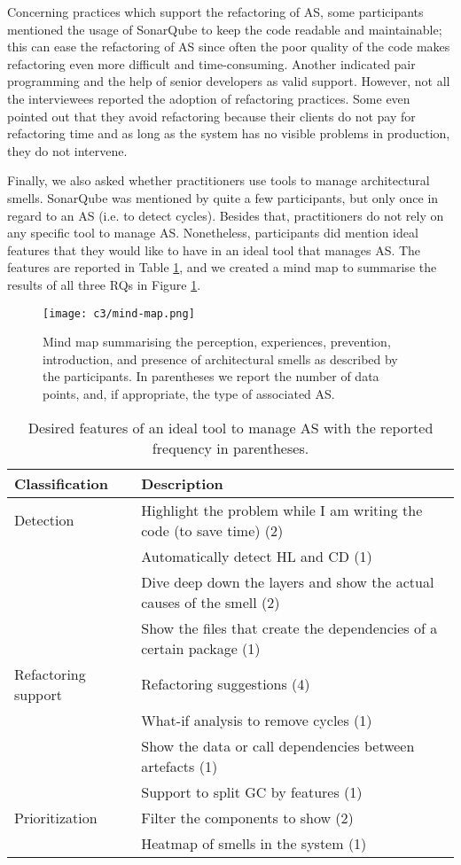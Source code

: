 Concerning practices which support the refactoring of AS, some participants mentioned the usage of SonarQube to keep the code readable and maintainable; this can ease the refactoring of AS since often the poor quality of the code makes refactoring even more difficult and time-consuming. Another indicated pair programming and the help of senior developers as valid support. However, not all the interviewees reported the adoption of refactoring practices. Some even pointed out that they avoid refactoring because their clients do not pay for refactoring time and as long as the system has no visible problems in production, they do not intervene.

Finally, we also asked whether practitioners use tools to manage architectural smells. SonarQube was mentioned by quite a few participants, but only once in regard to an AS (i.e. to detect cycles). Besides that, practitioners do not rely on any specific tool to manage AS. Nonetheless, participants did mention ideal features that they would like to have in an ideal tool that manages AS. The features are reported in Table \ref{c3:tab:ideal-features}, and we created a mind map to summarise the results of all three RQs in Figure \ref{fig:c3:mind-map}.

\begin{figure}
	\centering
	\texttt{[image: c3/mind-map.png]}
	\caption{Mind map summarising the perception, experiences, prevention, introduction, and presence of architectural smells as described by the participants. In parentheses we report the number of data points, and, if appropriate, the type of associated AS.}\label{fig:c3:mind-map}
\end{figure}

\begin{table}[h]
    \centering
    \footnotesize
    \caption{Desired features of an ideal tool to manage AS with the reported frequency in parentheses.}
    \label{c3:tab:ideal-features}
    \begin{tabular}{@{}ll@{}}\toprule
    \textbf{Classification} & \textbf{Description} \\ \midrule
    Detection & Highlight the problem while I am writing the code (to save time) (2) \\
     & Automatically detect HL and CD (1) \\
     & Dive deep down the layers and show the actual causes of the smell (2) \\
     & Show the files that create the dependencies of a certain package (1) \\
    Refactoring support & Refactoring suggestions (4) \\
     & What-if analysis to remove cycles (1) \\
     & Show the data or call dependencies between artefacts (1) \\
     & Support to split GC by features (1) \\
    Prioritization & Filter the components to show (2) \\
     & Heatmap of smells in the system (1) \\ \bottomrule
    \end{tabular}
\end{table}

